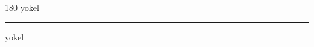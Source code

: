 
\begin{frame}
\begin{center}
\begin{turn}{180}
{\fontsize{2.5cm}{1em}\selectfont yokel}
\end{turn}
\vspace{1em}\par  
\hrule
\vspace{1em}\par  
{\fontsize{2.5cm}{1em}\selectfont yokel}
\end{center}
\end{frame}

